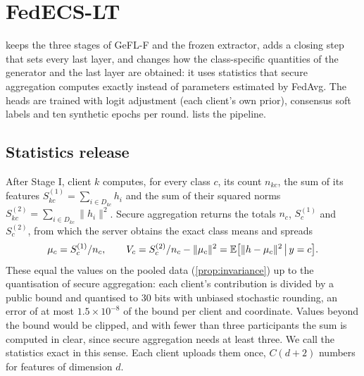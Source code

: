 \section{FedECS-LT}\label{sec:method}

\ours keeps the three stages of GeFL-F and the frozen extractor, adds a closing step that sets every last layer, and
changes how the class-specific quantities of the generator and the last layer are obtained: it uses statistics that
secure aggregation computes exactly instead of parameters estimated by FedAvg. The heads are trained with logit
adjustment (each client's own prior), consensus soft labels and ten synthetic epochs per round.  lists the pipeline.


\subsection{Statistics release}\label{sec:method-stats}

After Stage I, client $k$ computes, for every class $c$, its count $n_{kc}$, the sum of its features
$S^{(1)}_{kc}=\sum_{i\in D_{kc}}h_i$ and the sum of their squared norms $S^{(2)}_{kc}=\sum_{i\in D_{kc}}\|h_i\|^2$.
Secure aggregation returns the totals $n_c$, $S^{(1)}_c$ and $S^{(2)}_c$, from which the server obtains the exact class
means and spreads
\begin{equation}\label{eq:moments}
\mu_c=S^{(1)}_c/n_c,\qquad V_c=S^{(2)}_c/n_c-\|\mu_c\|^2=\mathbb{E}\big[\|h-\mu_c\|^2\,\big|\,y=c\big].
\end{equation}
These equal the values on the pooled data (\cref{prop:invariance}) up to the quantisation of secure aggregation:
each client's contribution is divided by a public bound and quantised to 30 bits with unbiased stochastic rounding,
an error of at most $1.5\times10^{-8}$ of the bound per client and coordinate. Values beyond the bound would be clipped,
and with fewer than three participants the sum is computed in clear, since secure aggregation needs at least three.
We call the statistics exact in this
sense. Each client uploads them once, $C(d+2)$ numbers for features of dimension $d$.

